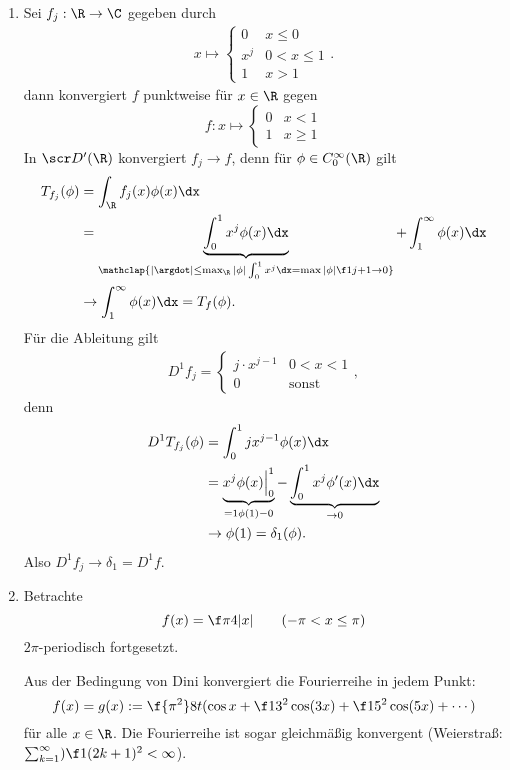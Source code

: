 \begin{ex} \label{5.17}
	\begin{enumerate}[1)]
		\item
			Sei $f_j: \R \to \C$ gegeben durch
			\begin{align*}
				x \mapsto \begin{cases}
					0 & x \le 0 \\
					x^j & 0 < x \le 1 \\
					1 & x > 1
				\end{cases}.
			\end{align*}
			dann konvergiert $f$ punktweise für $x \in \R$ gegen
			\[
				f: x \mapsto \begin{cases}
					0 & x < 1 \\
					1 & x \ge 1
				\end{cases}
			\]
			In $\scr D'(\R)$ konvergiert $f_j \to f$, denn für $\phi \in C_0^\infty(\R)$ gilt
			\begin{align*}
				T_{f_j}(\phi) 
				&= \int_{\R} f_j(x) \phi(x) \dx \\
				&= \underbrace{\int_{0}^1 x^j \phi(x) \dx}_{\mathclap{|\argdot| \le \max_{\R}|\phi| \int_0^1 x^j \dx = \max |\phi| \f 1{j+1} \to 0}} + \int_{1}^\infty \phi(x) \dx \\
				&\to \int_{1}^\infty \phi(x) \dx
				= T_f(\phi).
			\end{align*}
			Für die Ableitung gilt
			\begin{align*}
				D^1  f_j = \begin{cases}
					j \cdot x^{j-1} & 0 < x < 1 \\
					0 & \text{sonst}
				\end{cases},
			\end{align*}
			denn
			\begin{align*}
				D^1 T_{f_j}(\phi)
				&= \int_{0}^1 j x^{j-1} \phi(x) \dx \\
				&= \underbrace{x^j \phi(x) \Big|_0^1}_{=1 \phi(1) - 0} - \underbrace{\int_{0}^1 x^j \phi'(x) \dx}_{\to 0} \\
				&\to \phi(1) = \delta_1(\phi).
			\end{align*}
			Also $D^1 f_j \to \delta_1 = D^1 f$.
		\item
			Betrachte
			\[
				f(x) = \f \pi4 |x|
				\qquad (-\pi < x \le \pi)
			\]
			$2\pi$-periodisch fortgesetzt.
			
			Aus der Bedingung von Dini konvergiert die Fourierreihe in jedem Punkt:
			\[
				f(x) = g(x) := \f {\pi^2}8 t ( \cos x + \f 1{3^2} \cos (3x) + \f 1{5^2} \cos(5x) + \dotsb )
			\]
			für alle $x \in \R$.
			Die Fourierreihe ist sogar gleichmäßig konvergent (Weierstraß: $\sum_{k=1}^\infty) \f 1{(2k+1)^2} < \infty$).


\end{enumerate}
\end{ex}
